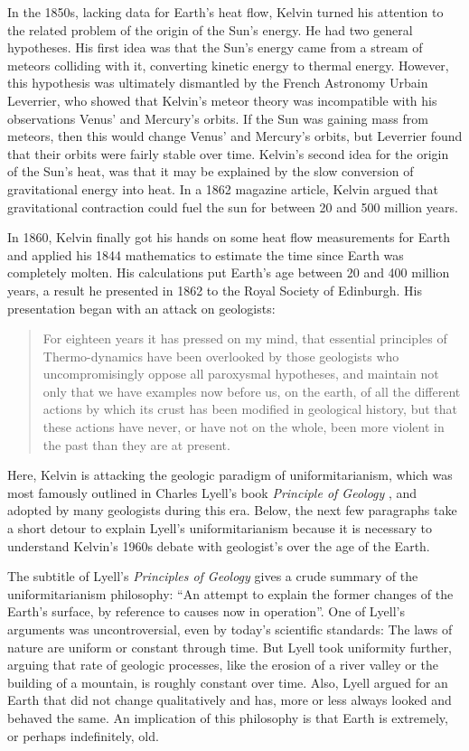 \documentclass[12pt]{article}
\begin{document}
In the 1850s, lacking data for Earth's heat flow, Kelvin turned his attention to the related problem of the origin of the Sun's energy. He had two general hypotheses. His first idea was that the Sun's energy came from a stream of meteors colliding with it, converting kinetic energy to thermal energy. However, this hypothesis was ultimately dismantled by the French Astronomy Urbain Leverrier, who showed that Kelvin's meteor theory was incompatible with his observations Venus' and Mercury's orbits. If the Sun was gaining mass from meteors, then this would change Venus' and Mercury's orbits, but Leverrier found that their orbits were fairly stable over time. Kelvin's second idea for the origin of the Sun's heat, was that it may be explained by the slow conversion of gravitational energy into heat. In a 1862 magazine article, Kelvin argued that gravitational contraction could fuel the sun for between 20 and 500 million years.

In 1860, Kelvin finally got his hands on some heat flow measurements for Earth and applied his 1844 mathematics to estimate the time since Earth was completely molten. His calculations put Earth's age between 20 and 400 million years, a result he presented in 1862 to the Royal Society of Edinburgh. His presentation began with an attack on geologists: 

\begin{quote}
  For eighteen years it has pressed on my mind, that essential principles of Thermo-dynamics have been overlooked by those geologists who uncompromisingly oppose all paroxysmal hypotheses, and maintain not only that we have examples now before us, on the earth, of all the different actions by which its crust has been modified in geological history, but that these actions have never, or have not on the whole, been more violent in the past than they are at present.
\end{quote}
Here, Kelvin is attacking the geologic paradigm of uniformitarianism, which was most famously outlined in Charles Lyell's book \emph{Principle of Geology} \citep{Lyell_1833}, and adopted by many geologists during this era. Below, the next few paragraphs take a short detour to explain Lyell's uniformitarianism because it is necessary to understand Kelvin's 1960s debate with geologist's over the age of the Earth.

The subtitle of Lyell's \emph{Principles of Geology} gives a crude summary of the uniformitarianism philosophy: ``An attempt to explain the former changes of the Earth's surface, by reference to causes now in operation''. One of Lyell's arguments was uncontroversial, even by today's scientific standards: The laws of nature are uniform or constant through time. But Lyell took uniformity further, arguing that rate of geologic processes, like the erosion of a river valley or the building of a mountain, is roughly constant over time. Also, Lyell argued for an Earth that did not change qualitatively and has, more or less always looked and behaved the same. An implication of this philosophy is that Earth is extremely, or perhaps indefinitely, old.
\end{document}
